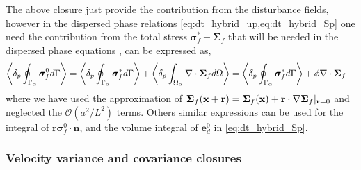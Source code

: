 The above closure just provide the contribution from the disturbance fields, however in the dispersed phase relations \eqref{eq:dt_hybrid_up,eq:dt_hybrid_Sp} one need the contribution from the total stress $\bm\sigma_f^* +\bm\Sigma_f$ that will be needed in the dispersed phase equations , can be expressed as\citep{zhang1997momentum,morel2015mathematical}, 
\begin{align}
    \pSavg{\bm\sigma_f^0}
    =
    \pSavg{\bm\sigma_f^*}
    + \pOavg{\div\bm\Sigma_f} 
    &= 
    \pSavg{\bm\sigma_f^*}
    + \phi\div\bm\Sigma_f  
    \label{eq:mean_contributions}
\end{align}
where we have used the approximation of $\bm\Sigma_f(\textbf{x}+\textbf{r}) = \bm\Sigma_f(\textbf{x}) + \textbf{r}\cdot\mathbf{\nabla} \bm\Sigma_f|_{\textbf{r}=0}$ and neglected the $\mathcal{O}(a^2/L^2)$ terms. 
Others similar expressions can be used for the integral of $\textbf{r}\bm\sigma_f^0\cdot \textbf{n}$, and the volume integral of $\textbf{e}_d^0$ in \ref{eq:dt_hybrid_Sp}. 


\subsubsection{Velocity variance and covariance closures}



